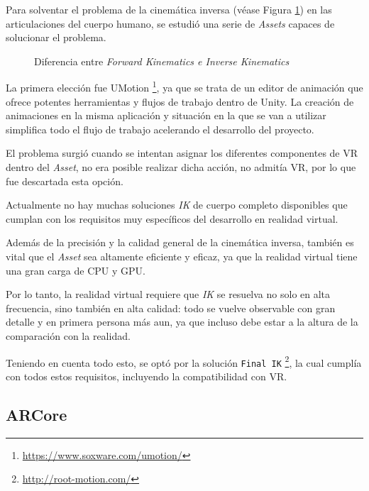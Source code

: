 Para solventar el problema de la cinemática inversa (véase Figura \ref{fig:IK}) en las articulaciones del cuerpo humano, se estudió una serie de \textit{Assets} capaces de solucionar el problema.

\begin{figure}[h!]
    \centering
    \caption{Diferencia entre \textit{Forward Kinematics e Inverse Kinematics}}
    \label{fig:IK}  
\end{figure}

La primera elección fue UMotion \footnote{\url{ https://www.soxware.com/umotion/}}, ya que se trata de un editor de animación que ofrece potentes herramientas y flujos de trabajo dentro de Unity. La creación de animaciones en la misma aplicación y situación en la que se van a utilizar simplifica todo el flujo de trabajo acelerando el desarrollo del proyecto. 

El problema surgió cuando se intentan asignar los diferentes componentes de VR dentro del \textit{Asset}, no era posible realizar dicha acción, no admitía VR, por lo que fue descartada esta opción.

\vspace{1cm}
Actualmente no hay muchas soluciones \textit{IK} de cuerpo completo disponibles que cumplan con los requisitos muy específicos del desarrollo en realidad virtual.

Además de la precisión y la calidad general de la cinemática inversa, también es vital que el \textit{Asset} sea altamente eficiente y eficaz, ya que la realidad virtual tiene una gran carga de CPU y GPU. 

Por lo tanto, la realidad virtual requiere que \textit{IK} se resuelva no solo en alta frecuencia, sino también en alta calidad: todo se vuelve observable con gran detalle y en primera persona más aun, ya que incluso debe estar a la altura de la comparación con la realidad.

Teniendo en cuenta todo esto, se optó por la solución \texttt{Final IK} \footnote{\url{http://root-motion.com/}}, la cual cumplía con todos estos requisitos, incluyendo la compatibilidad con VR. 

\subsection{ARCore}